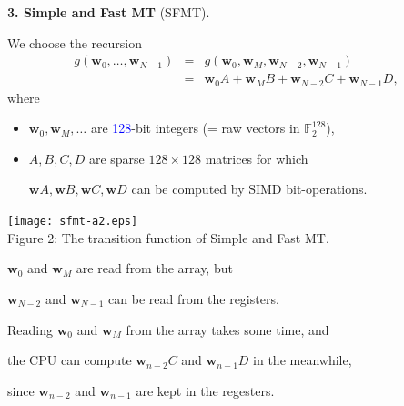 \documentclass[a4j,12pt,landscape]{jarticle}
\def\F2{{\mathbb F}_2}
\def\bw{{{\mathbf w}}}
\begin{document}
\newpage
\noindent
{\bf 3. Simple and Fast MT} (SFMT).

We choose the recursion
\begin{eqnarray*}
g(\bw_0,\ldots,\bw_{N-1}) &=& g(\bw_0, \bw_M, \bw_{N-2}, \bw_{N-1}) \\
&=& \bw_0A + \bw_MB + \bw_{N-2}C + \bw_{N-1}D,
\end{eqnarray*}
where 
\begin{itemize}
\item
$\bw_0, \bw_M, \ldots$ are \textcolor{blue}{128}-bit integers 
(= raw vectors in $\F2^{128}$),

\item
$A, B, C, D$ are sparse $128 \times 128$ matrices
for which 

$\bw A, \bw B, \bw C, \bw D$ can be computed by
SIMD bit-operations.
\end{itemize}

\newpage
\begin{center}
\texttt{[image: sfmt-a2.eps]}
\\
Figure 2: The transition function of Simple and Fast MT.

$\bw_0$ and $\bw_M$ are read from the array, but

$\bw_{N-2}$ and $\bw_{N-1}$ can be read from the registers.
\end{center}

\newpage
Reading $\bw_0$ and $\bw_M$ from the array takes some time, and 

the CPU can compute $\bw_{n-2}C$ and $\bw_{n-1}D$ in the meanwhile, 

since $\bw_{n-2}$ and $\bw_{n-1}$ are kept in the regesters.
\end{document}
